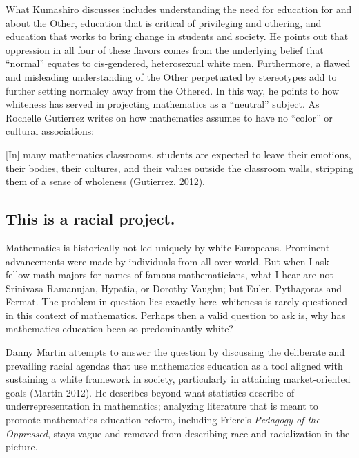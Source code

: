 What Kumashiro discusses includes understanding the need for education for and about the Other, education that is critical of privileging and othering, and education that works to bring change in students and society. He points out that oppression in all four of these flavors comes from the underlying belief that ``normal'' equates to cis-gendered, heterosexual white men. Furthermore, a flawed and misleading understanding of the Other perpetuated by stereotypes add to further setting normalcy away from the Othered. In this way, he points to how whiteness has served in projecting mathematics as a ``neutral'' subject. As Rochelle Gutierrez writes on how mathematics assumes to have no ``color'' or cultural associations:
\begin{displayquote}
  {[In]} many mathematics classrooms, students are expected to leave their emotions, their bodies, their cultures, and their values outside the classroom walls, stripping them of a sense of wholeness (Gutierrez, 2012).
\end{displayquote}

\subsection{This is a racial project.}
Mathematics is historically not led uniquely by white Europeans. Prominent advancements were made by individuals from all over world. But when I ask fellow math majors for names of famous mathematicians, what I hear are not Srinivasa Ramanujan, Hypatia, or Dorothy Vaughn; but Euler, Pythagoras and Fermat. The problem in question lies exactly here--whiteness is rarely questioned in this context of mathematics. Perhaps then a valid question to ask is, why has mathematics education been so predominantly white?

Danny Martin attempts to answer the question by discussing the deliberate and prevailing racial agendas that use mathematics education as a tool aligned with sustaining a white framework in society, particularly in attaining market-oriented goals (Martin 2012). He describes beyond what statistics describe of underrepresentation in mathematics; analyzing literature that is meant to promote mathematics education reform, including Friere's \textit{Pedagogy of the Oppressed}, stays vague and removed from describing race and racialization in the picture.

